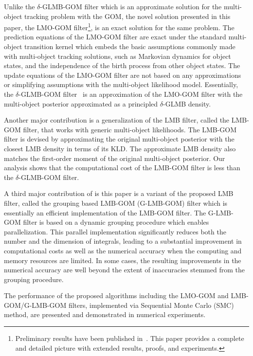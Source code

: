 \documentclass[journal]{IEEEtran}
\begin{document}
Unlike the $\delta$-GLMB-GOM filter which is an approximate solution for the  multi-object tracking problem with the GOM, the novel solution presented in this paper, the  LMO-GOM filter\footnote{Preliminary results have been published in~\cite{refr:conference-GOM}. This paper provides a complete and detailed picture with extended results, proofs, and experiments.}, is an exact solution for the same problem.
The prediction equations of the LMO-GOM filter are exact under the standard multi-object transition kernel which embeds  the basic assumptions commonly made with multi-object tracking solutions, such as Markovian dynamics for object states, and the independence of the  birth process from other object states.  The update equations of the LMO-GOM filter are not  based on any approximations or simplifying assumptions with the multi-object likelihood model. Essentially, the $\delta$-GLMB-GOM filter~ is an  approximation of the LMO-GOM filter with the multi-object posterior  approximated as a principled $\delta$-GLMB density. 





Another major contribution is a generalization of the LMB filter, called the  LMB-GOM filter, that works with generic multi-object likelihoods. The LMB-GOM filter is devised by approximating the original multi-object posterior  with the closest LMB density in terms of its KLD. The approximate LMB density also matches the  first-order moment of the original multi-object posterior.  
Our analysis shows that    the computational cost of the LMB-GOM filter  is  less than the $\delta$-GLMB-GOM filter.

A third major contribution of is  this paper is a variant of the proposed LMB filter, called the grouping based LMB-GOM (G-LMB-GOM) filter which is essentially an efficient implementation  of the  LMB-GOM filter.  The G-LMB-GOM filter is based on a dynamic grouping procedure which enables parallelization.
This parallel implementation significantly reduces both the number and the dimension of integrals,    leading to a substantial improvement in computational costs  as well as the numerical accuracy  when the computing and memory  resources are  limited.  In some cases, the resulting improvements in the numerical accuracy are well beyond the extent of inaccuracies stemmed from the grouping procedure.




The performance of the proposed algorithms including the LMO-GOM and LMB-GOM/G-LMB-GOM filters, implemented via Sequential Monte Carlo (SMC) method, are presented and  demonstrated in numerical experiments.
\end{document}
